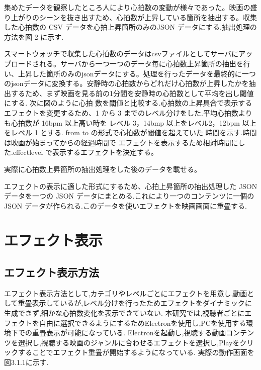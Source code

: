 集めたデータを観察したところ人により心拍数の変動が様々であった。映画の盛り上がりのシーンを抜き出すため、心拍数が上昇している箇所を抽出する。収集した心拍数の CSV データを心拍上昇箇所のみのJSON データにする.抽出処理の方法を図 2 に示す.

スマートウォッチで収集した心拍数のデータはcsvファイルとしてサーバにアップロードされる。サーバから一つ一つのデータ毎に心拍数上昇箇所の抽出を行い、上昇した箇所のみのjsonデータにする。処理を行ったデータを最終的に一つのjsonデータに変換する。安静時の心拍数からどれだけ心拍数が上昇したかを抽出するため、まず映画を見る前の1分間を安静時の心拍数として平均を出し閾値にする. 次に図のように心拍 数を閾値と比較する.心拍数の上昇具合で表示するエフェクトを変更するため、1 から 3 までのレベル分けをした.平均心拍数よりも心拍数が 16bpm 以上高い時を レベル 3，14bmp 以上をレベル2，12bpm 以上をレベル 1 とする. from to の形式で心拍数が閾値を超えていた 時間を示す.時間は映画が始まってからの経過時間で エフェクトを表示するため相対時間にした.effectlevel で表示するエフェクトを決定する。

実際に心拍数上昇箇所の抽出処理をした後のデータを載せる。

エフェクトの表示に適した形式にするため、心拍上昇箇所の抽出処理した JSON データを一つの JSON データにまとめる.これにより一つのコンテンツに一個の JSON データが作られる.このデータを使いエフェクトを映画画面に重畳する.

\section{エフェクト表示}

\subsection{エフェクト表示方法}
エフェクト表示方法として,カテゴリやレベルごとにエフェクトを用意し,動画として重畳表示しているが,レベル分けを行ったためエフェクトをダイナミックに生成できず,細かな心拍数変化を表示できていない.
本研究では,視聴者ごとにエフェクトを自由に選択できるようにするためElectronを使用し,PCを使用する環境下での重畳表示が可能になっている.
Electronを起動し,視聴する動画コンテンツを選択し,視聴する映画のジャンルに合わせるエフェクトを選択し,Playをクリックすることでエフェクト重畳が開始するようになっている.
実際の動作画面を図3.1.1に示す.



